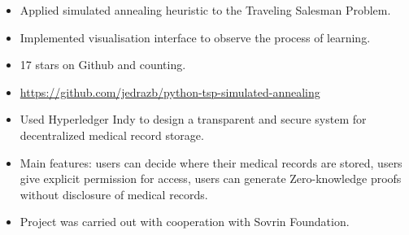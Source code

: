 \begin{itemize}
\item Applied simulated annealing heuristic to the Traveling Salesman Problem.
\item Implemented visualisation interface to observe the process of learning.
\item 17 stars on Github and counting.
\item \href{https://github.com/jedrazb/python-tsp-simulated-annealing}{https://github.com/jedrazb/python-tsp-simulated-annealing}
\end{itemize}
\begin{itemize}
\item Used Hyperledger Indy to design a transparent and secure system for decentralized medical record storage.
\item Main features: users can decide where their medical records are stored, users give explicit permission for access, users can generate Zero-knowledge proofs without disclosure of medical records.
\item Project was carried out with cooperation with Sovrin Foundation.
\end{itemize}
\smallskip

